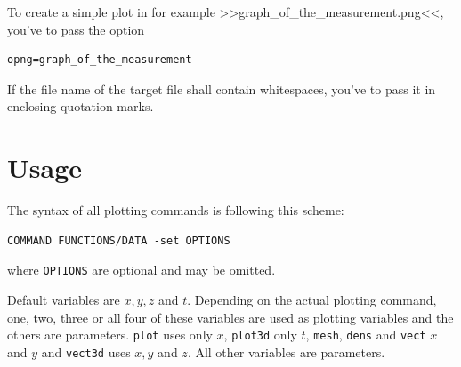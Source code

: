 \documentclass[DIV=14,headsepline,footsepline]{scrbook}
\begin{document}
				To create a simple plot in for example >>graph\_of\_the\_measurement.png<<, you've to pass the option
				\begin{lstlisting}
opng=graph_of_the_measurement
				\end{lstlisting}
				If the file name of the target file shall contain whitespaces, you've to pass it in enclosing quotation marks.
				
			\section{Usage}
				The syntax of all plotting commands is following this scheme:
				\begin{lstlisting}
COMMAND FUNCTIONS/DATA -set OPTIONS
				\end{lstlisting}
				where \verb+OPTIONS+ are optional and may be omitted.

				Default variables are $x, y, z$ and $t$. Depending on the actual plotting command, one, two, three or all four of these variables are used as plotting variables and the others are parameters. \verb+plot+ uses only $x$, \verb+plot3d+ only $t$, \verb+mesh+, \verb+dens+ and \verb+vect+ $x$ and $y$ and \verb+vect3d+ uses $x, y$ and $z$. All other variables are parameters.
				
\end{document}
